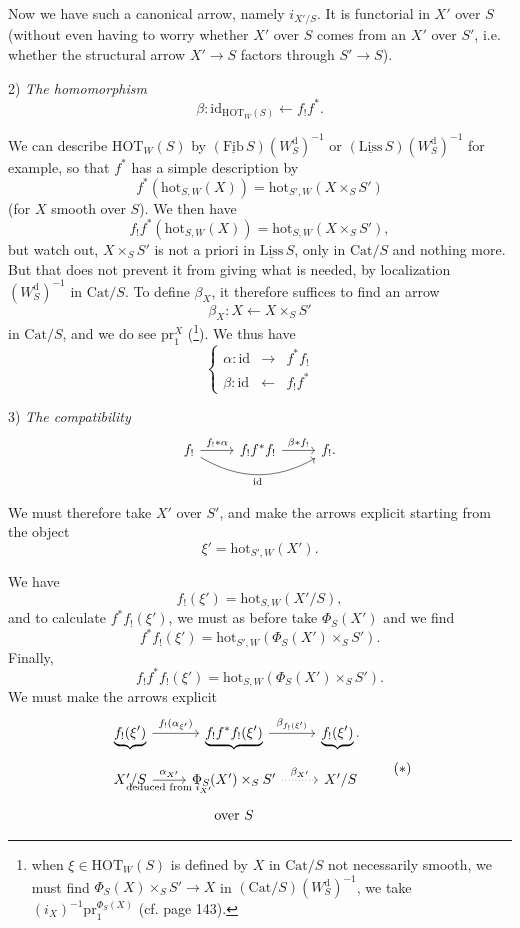 \documentclass[11pt]{article}
\newcommand{\printedpage}[1]{\marginpar{\footnotesize p.~#1}}
\newcommand{\msp}[1]{\marginpar{\footnotesize [#1]}}
\newcommand{\HOT}{\mathrm{HOT}}
\newcommand{\hot}{\mathrm{hot}}
\newcommand{\Cat}{\mathrm{Cat}}
\newcommand{\id}{\mathrm{id}}
\newcommand{\pr}{\mathrm{pr}}
\newcommand{\Wd}{W^{\mathrm{d}}}
\begin{document}
\printedpage{85}
Now we have such a canonical arrow, namely $i_{X'/S}$. It is functorial in $X'$ over $S$ (without even having to worry whether $X'$ over $S$ comes from an $X'$ over $S'$, i.e. whether the structural arrow $X'\longrightarrow S$ factors through $S'\longrightarrow S$).

\leavevmode\msp{page 140}2) \textit{The homomorphism}
\[
\beta : \id_{\HOT_W(S)} \longleftarrow f_!f^*.
\]

We can describe $\HOT_W(S)$ by $(\underline{\mathrm{Fib}}\,S)(\Wd_S)^{-1}$ or $(\underline{\mathrm{Liss}}\,S)(\Wd_S)^{-1}$ for example, so that $f^*$ has a simple description by
\[
f^*(\hot_{S,W}(X)) = \hot_{S',W}(X\times_S S')
\]
(for $X$ smooth over $S$). We then have
\[
f_!f^*(\hot_{S,W}(X)) = \hot_{S,W}(X\times_S S'),
\]
but watch out, $X\times_S S'$ is not a priori in $\underline{\mathrm{Liss}}\,S$, only in $\Cat/S$ and nothing more. But that does not prevent it from giving what is needed, by localization $(\Wd_S)^{-1}$ in $\Cat/S$. To define $\beta_X$, it therefore suffices to find an arrow
\[
\beta_X : X \longleftarrow X\times_S S'
\]
in $\Cat/S$, and we do see $\pr_1^X$ (\footnote[68]{when $\xi\in\HOT_W(S)$ is defined by $X$ in $\Cat/S$ not necessarily smooth, we must find $\Phi_S(X)\times_S S'\longrightarrow X$ in $(\Cat/S)(\Wd_S)^{-1}$, we take $(i_X)^{-1}\pr_1^{\Phi_S(X)}$ (cf. page 143).}). We thus have
\[
\left\{
\begin{array}{lcl}
\alpha : \id & \longrightarrow & f^*f_! \\
\beta : \id & \longleftarrow & f_!f^*
\end{array}
\right.
\]

3) \textit{The compatibility}
\[
\begin{tikzcd}
f_! \arrow[r, "f_!*\alpha"] \arrow[rr, bend right, "\id"'] & f_!f^*f_! \arrow[r, "\beta*f_!"] & f_!.
\end{tikzcd}
\]

We must therefore take $X'$ over $S'$, and make the arrows explicit starting from the object
\[
\xi' = \hot_{S',W}(X').
\]

\printedpage{86}
\leavevmode\msp{page 141}We have
\[
f_!(\xi') = \hot_{S,W}(X'/S),
\]
and to calculate $f^*f_!(\xi')$, we must as before take $\Phi_S(X')$ and we find
\[
f^*f_!(\xi') = \hot_{S',W}(\Phi_S(X')\times_S S').
\]
Finally,
\[
f_!f^*f_!(\xi') = \hot_{S,W}(\Phi_S(X')\times_S S').
\]
We must make the arrows explicit
\[
\begin{tikzcd}[row sep=small]
\underbrace{f_!(\xi')} \arrow[r, "{f_!(\alpha_{\xi'})}"] & \underbrace{f_!f^*f_!(\xi')} \arrow[r, "{\beta_{f_!(\xi')}}"] & \underbrace{f_!(\xi')}. \\
X'/S \arrow[r, "{\alpha_{X'}}", "{\text{deduced from } i_{X'}}"'] & \Phi_S(X')\times_S S' \arrow[r, dotted, "{\beta_{X'}}"] & X'/S \\
 & \text{over } S &
\end{tikzcd}
\tag*{$(*)$}
\]
\end{document}
